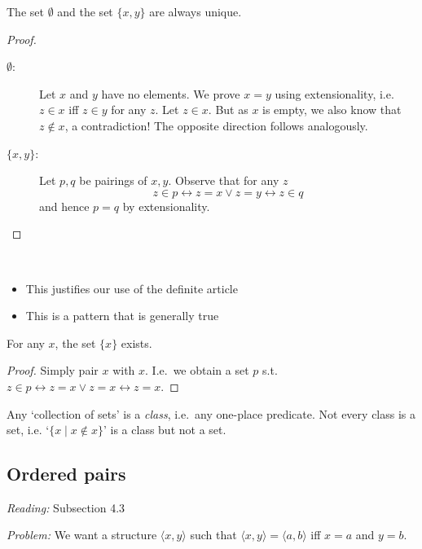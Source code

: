 \documentclass{whrartcl}
\begin{document}
\begin{proposition}[Uniqueness]
  The set $\emptyset$ and the set $\{x, y\}$ are always unique.
\end{proposition}
\begin{proof}
  \
  \begin{description}
  \item[$\emptyset$:] Let $x$ and $y$ have no elements. We prove $x = y$ using
    extensionality, i.e. $z \in x$ iff $z \in y$ for any $z$. Let $z \in x$. But
    as $x$ is empty, we also know that $z \not\in x$, a contradiction! The
    opposite direction follows analogously.
  \item[$\{x, y\}$:] Let $p, q$ be pairings of $x, y$. Observe that for any $z$
    \[
      z \in p \leftrightarrow z = x \vee z = y \leftrightarrow z \in q
    \]
    and hence $p = q$ by extensionality.
  \end{description}
\end{proof}

\begin{remark}
  \
  \begin{itemize}
  \item This justifies our use of the definite article
  \item This is a pattern that is generally true
  \end{itemize}
\end{remark}

\begin{proposition}[Singleton]
  For any $x$, the set $\{x\}$ exists.
\end{proposition}
\begin{proof}
  Simply pair $x$ with $x$. I.e.\ we obtain a set $p$ s.t.\ $z \in p
  \leftrightarrow z = x \vee z = x \leftrightarrow z = x$.
\end{proof}


\begin{remark}
  Any `collection of sets' is a \emph{class}, i.e.\ any one-place predicate. Not
  every class is a set, i.e. `$\{x \mid x \not\in x\}$' is a class but not a set.
\end{remark}

\subsection{Ordered pairs}
\emph{Reading:} Subsection 4.3

\emph{Problem:} We want a structure $\langle x, y \rangle$ such that $\langle x,
y\rangle = \langle a, b \rangle$ iff $x = a$ and $y = b$.
\end{document}
